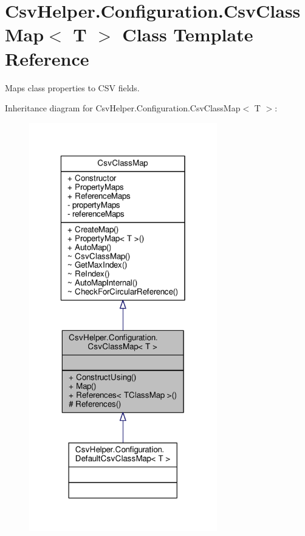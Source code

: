\hypertarget{a00058}{\section{Csv\-Helper.\-Configuration.\-Csv\-Class\-Map$<$ T $>$ Class Template Reference}
\label{a00058}
}


Maps class properties to C\-S\-V fields.  




Inheritance diagram for Csv\-Helper.\-Configuration.\-Csv\-Class\-Map$<$ T $>$\-:
\nopagebreak
\begin{figure}[H]
\begin{center}
\leavevmode
\includegraphics[width=232pt]{a00450}
\end{center}
\end{figure}


